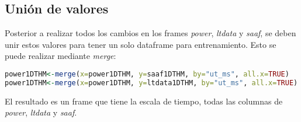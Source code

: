 \documentclass[../Main.tex]{subfiles}
\begin{document}
\subsection{Unión de valores}
Posterior a realizar todos los cambios en los frames \textit{power}, \textit{ltdata} y \textit{saaf}, se deben unir estos valores para tener un solo dataframe para entrenamiento. Esto se puede realizar mediante \textit{merge}:
\newline \par
\begin{lstlisting}[language=R]
power1DTHM<-merge(x=power1DTHM, y=saaf1DTHM, by="ut_ms", all.x=TRUE)
power1DTHM<-merge(x=power1DTHM, y=ltdata1DTHM, by="ut_ms", all.x=TRUE)
\end{lstlisting}
El resultado es un frame que tiene la escala de tiempo, todas las columnas de \textit{power}, \textit{ltdata} y \textit{saaf}.
\end{document}
